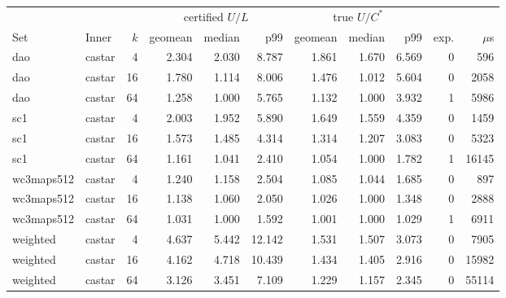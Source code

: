 \begin{tabular}{llr rrr rrr rr}\toprule
 & & & \multicolumn{3}{c}{certified $U/L$} & \multicolumn{3}{c}{true $U/C^*$} & & \\
Set & Inner & $k$ & geomean & median & p99 & geomean & median & p99 & exp. & $\mu$s\\\midrule
dao & castar & 4 & 2.304 & 2.030 & 8.787 & 1.861 & 1.670 & 6.569 & 0 & 596\\
dao & castar & 16 & 1.780 & 1.114 & 8.006 & 1.476 & 1.012 & 5.604 & 0 & 2058\\
dao & castar & 64 & 1.258 & 1.000 & 5.765 & 1.132 & 1.000 & 3.932 & 1 & 5986\\
sc1 & castar & 4 & 2.003 & 1.952 & 5.890 & 1.649 & 1.559 & 4.359 & 0 & 1459\\
sc1 & castar & 16 & 1.573 & 1.485 & 4.314 & 1.314 & 1.207 & 3.083 & 0 & 5323\\
sc1 & castar & 64 & 1.161 & 1.041 & 2.410 & 1.054 & 1.000 & 1.782 & 1 & 16145\\
wc3maps512 & castar & 4 & 1.240 & 1.158 & 2.504 & 1.085 & 1.044 & 1.685 & 0 & 897\\
wc3maps512 & castar & 16 & 1.138 & 1.060 & 2.050 & 1.026 & 1.000 & 1.348 & 0 & 2888\\
wc3maps512 & castar & 64 & 1.031 & 1.000 & 1.592 & 1.001 & 1.000 & 1.029 & 1 & 6911\\
weighted & castar & 4 & 4.637 & 5.442 & 12.142 & 1.531 & 1.507 & 3.073 & 0 & 7905\\
weighted & castar & 16 & 4.162 & 4.718 & 10.439 & 1.434 & 1.405 & 2.916 & 0 & 15982\\
weighted & castar & 64 & 3.126 & 3.451 & 7.109 & 1.229 & 1.157 & 2.345 & 0 & 55114\\
\bottomrule\end{tabular}
